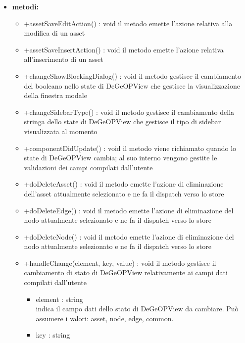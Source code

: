 \begin{itemize}
\begin{itemize}
	\end{itemize}
	\item \textbf{metodi:}
	\begin{itemize}
		\item +assetSaveEditAction() : void\newline
		il metodo emette l'azione relativa alla modifica di un asset
		\item +assetSaveInsertAction() : void\newline
		il metodo emette l'azione relativa all'inserimento di un asset
		\item +changeShowBlockingDialog() : void\newline
		il metodo gestisce il cambiamento del booleano nello state di DeGeOPView che gestisce la visualizzazione della finestra modale
		\item +changeSidebarType() : void\newline
		il metodo gestisce il cambiamento della stringa dello state di DeGeOPView che gestisce il tipo di sidebar visualizzata al momento
		\item +componentDidUpdate() : void\newline
		il metodo viene richiamato quando lo state di DeGeOPView cambia; al suo interno vengono gestite le validazioni dei campi compilati dall'utente
		\item +doDeleteAsset() : void\newline
		il metodo emette l'azione di eliminazione dell'asset attualmente selezionato e ne fa il dispatch verso lo store
		\item +doDeleteEdge() : void\newline
		il metodo emette l'azione di eliminazione del nodo attualmente selezionato e ne fa il dispatch verso lo store
		\item +doDeleteNode() : void\newline
		il metodo emette l'azione di eliminazione del nodo attualmente selezionato e ne fa il dispatch verso lo store
		\item +handleChange(element, key, value) : void\newline
		il metodo gestisce il cambiamento di stato di DeGeOPView relativamente ai campi dati compilati dall'utente
		\begin{itemize}
			\item element : string\\
			indica il campo dati dello stato di DeGeOPView da cambiare. Può assumere i valori:
			asset, node, edge, common.
			\item key : string\\

\end{itemize}
\end{itemize}
\end{itemize}
